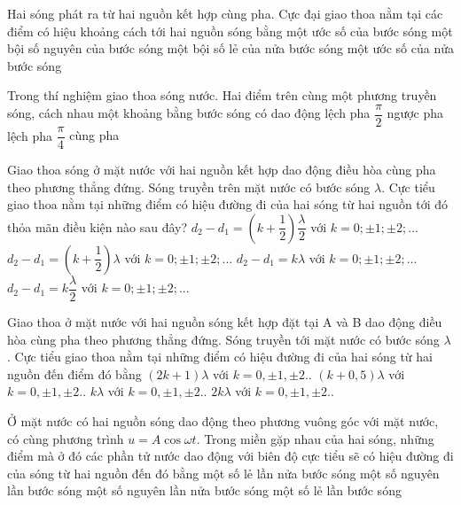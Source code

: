 \begin{ex}
Hai sóng phát ra từ hai nguồn kết hợp cùng pha. Cực đại giao thoa nằm tại các điểm có
hiệu khoảng cách tới hai nguồn sóng bằng
\choice
{một ước số của bước sóng}
{\True một bội số nguyên của bước sóng}
{một bội số lẻ của nửa bước sóng}
{một ước số của nửa bước sóng}
\loigiai{}
\end{ex}
\begin{ex}
Trong thí nghiệm giao thoa sóng nước. Hai điểm trên cùng một phương truyền sóng, cách nhau một khoảng bằng bước sóng có dao động
\choice
{lệch pha $\dfrac{\pi}{2}$}
{ngược pha}
{lệch pha $\dfrac{\pi}{4}$}
{\True cùng pha}
\loigiai{}
\end{ex}
\begin{ex}%
Giao thoa sóng ở mặt nước với hai nguồn kết hợp dao động điều hòa cùng pha theo phương thẳng đứng. Sóng truyền trên mặt nước có bước sóng $\lambda$. Cực tiểu giao thoa nằm tại những điểm có hiệu đường đi của hai sóng từ hai nguồn tới đó thỏa mãn điều kiện nào sau đây?
\choice
{$d_2-d_1=\left( k+\dfrac{1}{2} \right)\dfrac{\lambda}{2}$ với $k=0;\pm 1;\pm 2;...$}
{\True $d_2-d_1=\left( k+\dfrac{1}{2} \right)\lambda $ với $k=0;\pm 1;\pm 2;...$}
{$d_2-d_1=k\lambda $ với $k=0;\pm 1;\pm 2;...$}
{$d_2-d_1=k\dfrac{\lambda}{2}$ với $k=0;\pm 1;\pm 2;...$}
\end{ex} 
\begin{ex}%
 Giao thoa ở mặt nước với hai nguồn sóng kết hợp đặt tại A và B dao động điều hòa cùng pha theo phương thẳng đứng. Sóng truyền tới mặt nước có bước sóng $\lambda$ . Cực tiểu giao thoa nằm tại những điểm có hiệu đường đi của hai sóng từ hai nguồn đến điểm đó bằng
\choice
{$(2k+1)\lambda $ với $k=0,\pm 1,\pm 2..$}
{\True $(k+0,5)\lambda $ với $k=0,\pm 1,\pm 2..$}
{$k\lambda $ với $k=0,\pm 1,\pm 2..$}
{$2k\lambda $ với $k=0,\pm 1,\pm 2..$}
\end{ex} 
\begin{ex}%
Ở mặt nước có hai nguồn sóng dao động theo phương vuông góc với mặt nước, có cùng phương trình $u = A\cos\omega t$. Trong miền gặp nhau của hai sóng, những điểm mà ở đó các phần tử nước dao động với biên độ cực tiểu sẽ có hiệu đường đi của sóng từ hai nguồn đến đó bằng
\choice
{\True một số lẻ lần nửa bước sóng}
{một số nguyên lần bước sóng}
{một số nguyên lần nửa bước sóng}
{một số lẻ lần bước sóng}
\end{ex} 
